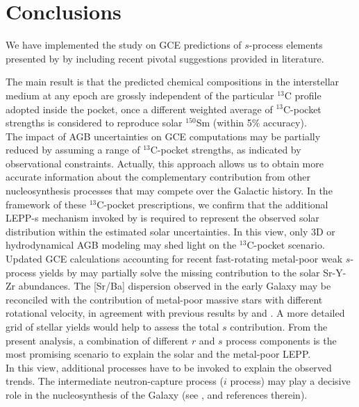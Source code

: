 \documentclass[manuscript]{aastex}
\begin{document}
 

\section{Conclusions}\label{conclusions}


We have implemented the study on GCE predictions of $s$-process
elements presented by \citet{bisterzo14} by
including recent pivotal suggestions provided in literature. 

The main result is that the predicted chemical compositions in the interstellar medium at any epoch 
are grossly independent of the particular $^{13}$C profile adopted inside the pocket,
once a different weighted average of $^{13}$C-pocket strengths is considered to 
reproduce solar $^{150}$Sm (within 5\% accuracy).
\\
The impact of AGB uncertainties on GCE computations may be partially reduced by assuming
a range of $^{13}$C-pocket strengths, as indicated by observational constraints. 
Actually, this approach allows us to obtain more accurate information about the complementary 
contribution from other nucleosynthesis processes that may compete over the Galactic history.
In the framework of these $^{13}$C-pocket prescriptions, we confirm that the 
additional LEPP-s mechanism invoked by \citet{travaglio04} is 
required to represent the observed solar distribution within the estimated solar uncertainties. 
 In this view, only 3D or hydrodynamical AGB modeling may shed light on the $^{13}$C-pocket 
scenario.
\\
Updated GCE calculations accounting for recent fast-rotating metal-poor weak $s$-process
yields by \citet{fris16} may partially solve the missing contribution to the solar Sr-Y-Zr
abundances. 
The [Sr/Ba] dispersion observed in the early Galaxy may be reconciled with the contribution 
of metal-poor massive stars with different rotational velocity, in agreement with previous 
results by \citet{chiappini11} and \citet{cescutti13}.
A more detailed grid of stellar yields would help to assess the total $s$ 
contribution. From the present analysis, a combination of different $r$ and $s$ process 
components is the most promising scenario to explain the solar and the metal-poor LEPP.
\\
In this view, additional processes have to be invoked to explain the observed trends.
The intermediate neutron-capture process ($i$ process) may play a decisive 
role in the nucleosynthesis of the Galaxy (see \citealt{roederer16,mishenina15a}, and 
references therein). 
\end{document}
